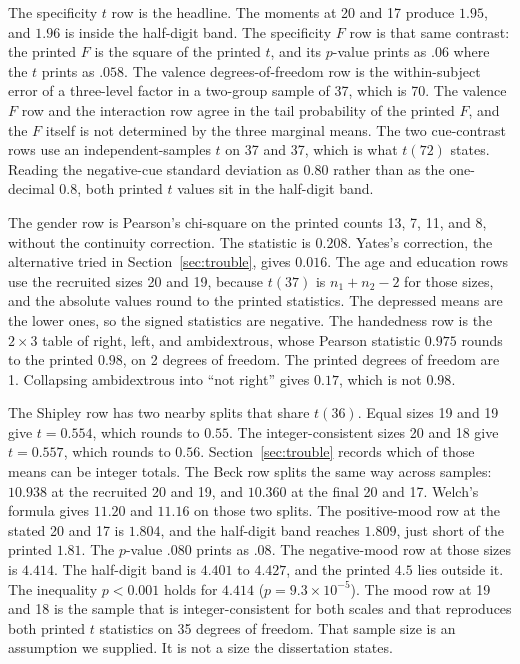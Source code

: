 \documentclass[11pt]{article}
\begin{document}
The specificity \(t\) row is the headline.
The moments at 20 and 17 produce \(1.95\), and \(1.96\) is inside the
half-digit band.
The specificity \(F\) row is that same contrast: the printed \(F\) is the
square of the printed \(t\), and its \(p\)-value prints as \(.06\) where the
\(t\) prints as \(.058\).
The valence degrees-of-freedom row is the within-subject error of a
three-level factor in a two-group sample of 37, which is 70.
The valence \(F\) row and the interaction row agree in the tail probability
of the printed \(F\), and the \(F\) itself is not determined by the three
marginal means.
The two cue-contrast rows use an independent-samples \(t\) on 37 and 37,
which is what \(t(72)\) states.
Reading the negative-cue standard deviation as \(0.80\) rather than as the
one-decimal \(0.8\), both printed \(t\) values sit in the half-digit band.

The gender row is Pearson's chi-square on the printed counts 13, 7, 11, and
8, without the continuity correction.
The statistic is \(0.208\).
Yates's correction, the alternative tried in
Section~\ref{sec:trouble}, gives \(0.016\).
The age and education rows use the recruited sizes 20 and 19, because
\(t(37)\) is \(n_1+n_2-2\) for those sizes, and the absolute values round to
the printed statistics.
The depressed means are the lower ones, so the signed statistics are
negative.
The handedness row is the \(2\times 3\) table of right, left, and
ambidextrous, whose Pearson statistic \(0.975\) rounds to the printed
\(0.98\), on 2 degrees of freedom.
The printed degrees of freedom are 1.
Collapsing ambidextrous into ``not right'' gives \(0.17\), which is not
\(0.98\).

The Shipley row has two nearby splits that share \(t(36)\).
Equal sizes 19 and 19 give \(t = 0.554\), which rounds to \(0.55\).
The integer-consistent sizes 20 and 18 give \(t = 0.557\), which rounds to
\(0.56\).
Section~\ref{sec:trouble} records which of those means can be integer
totals.
The Beck row splits the same way across samples: \(10.938\) at the recruited
20 and 19, and \(10.360\) at the final 20 and 17.
Welch's formula gives \(11.20\) and \(11.16\) on those two splits.
The positive-mood row at the stated 20 and 17 is \(1.804\), and the
half-digit band reaches \(1.809\), just short of the printed \(1.81\).
The \(p\)-value \(.080\) prints as \(.08\).
The negative-mood row at those sizes is \(4.414\).
The half-digit band is \(4.401\) to \(4.427\), and the printed \(4.5\) lies
outside it.
The inequality \(p < 0.001\) holds for \(4.414\)
(\(p = 9.3\times 10^{-5}\)).
The mood row at 19 and 18 is the sample that is integer-consistent for both
scales and that reproduces both printed \(t\) statistics on 35 degrees of
freedom.
That sample size is an assumption we supplied.
It is not a size the dissertation states.
\end{document}
